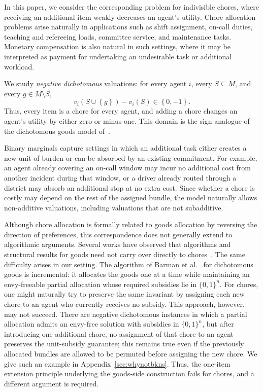 \documentclass[sigconf,anonymous]{aamas}
\newcommand{\items}{M}
\newcommand{\set}[1]{\left\{#1\right\}}
\theoremstyle{acmplain}
\theoremstyle{acmdefinition}
\theoremstyle{acmplain}
\begin{document}
In this paper, we consider the corresponding problem for indivisible chores, where receiving an additional item weakly decreases an agent's utility. Chore-allocation problems arise naturally in applications such as shift assignment, on-call duties, teaching and refereeing loads, committee service, and maintenance tasks. Monetary compensation is also natural in such settings, where it may be interpreted as payment for undertaking an undesirable task or additional workload.

We study \emph{negative dichotomous} valuations: for every agent $i$, every $S\subseteq \items$, and every $g\in \items\setminus S$, \[ v_i(S\cup\set{g})-v_i(S)\in\set{0,-1}. \] Thus, every item is a chore for every agent, and adding a chore changes an agent's utility by either zero or minus one. This domain is the sign analogue of the dichotomous goods model of~\cite{BKNS22}.

Binary marginals capture settings in which an additional task either creates a new unit of burden or can be absorbed by an existing commitment. For example, an agent already covering an on-call window may incur no additional cost from another incident during that window, or a driver already routed through a district may absorb an additional stop at no extra cost. Since whether a chore is costly may depend on the rest of the assigned bundle, the model naturally allows non-additive valuations, including valuations that are not subadditive.

Although chore allocation is formally related to goods allocation by reversing the direction of preferences, this correspondence does not generally extend to algorithmic arguments. Several works have observed that algorithms and structural results for goods need not carry over directly to chores~\cite{aziz2017algorithms,sun2023fairness, BSV21}. The same difficulty arises in our setting. The algorithm of Barman et al.~\cite{BKNS22} for dichotomous goods is incremental: it allocates the goods one at a time while maintaining an envy-freeable partial allocation whose required subsidies lie in $\{0,1\}^n$. For chores, one might naturally try to preserve the same invariant by assigning each new chore to an agent who currently receives no subsidy. This approach, however, may not succeed. There are negative dichotomous instances in which a partial allocation admits an envy-free solution with subsidies in $\{0,1\}^n$, but after introducing one additional chore, no assignment of that chore to an agent preserves the unit-subsidy guarantee; this remains true even if the previously allocated bundles are allowed to be permuted before assigning the new chore. We give such an example in Appendix~\ref{sec:whynotbkns}. Thus, the one-item extension principle underlying the goods-side construction fails for chores, and a different argument is required.
\end{document}

